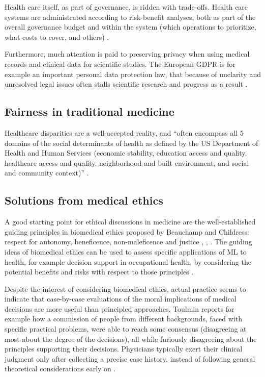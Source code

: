     Health care itself, as part of governance, is ridden with trade-offs.
    Health care systems are administrated according to risk-benefit analyses, both as part of the overall governance budget and within the system (which operations to prioritize, what costs to cover, and others) \cite{Dionne2018}.

    Furthermore, much attention is paid to preserving privacy when using medical records and clinical data for scientific studies.
    The European GDPR is for example an important personal data protection law, that because of unclarity and unresolved legal issues often stalls scientific research and progress as a result \cite{Eiss2020}.


\subsection{Fairness in traditional medicine}
    Healthcare disparities are a well-accepted reality, and ``often encompass all 5 domains of the social determinants of health as defined by the US Department of Health and Human Services (economic stability, education access and quality, healthcare access and quality, neighborhood and built environment, and social and community context)'' \cite[p.~2]{Chen2021}.


\subsection{Solutions from medical ethics}
    A good starting point for ethical discussions in medicine are the well-established guiding principles in biomedical ethics proposed by Beauchamp and Childress: respect for autonomy, beneficence, non-maleficence and justice \cite[pp.~344-345]{Dijkstra2020}, \cite[p.~2]{Morley2020}, \cite[p.~2]{Rajkomar2018}.
    The guiding ideas of biomedical ethics can be used to assess specific applications of ML to health, for example decision support in occupational health, by considering the potential benefits and risks with respect to those principles \cite{Dijkstra2020}.

    Despite the interest of considering biomedical ethics, actual practice seems to indicate that case-by-case evaluations of the moral implications of medical decisions are more useful than principled approaches.
    Toulmin\cite{Toulmin1982} reports for example how a commission of people from different backgrounds, faced with specific practical problems, were able to reach some consensus (disagreeing at most about the degree of the decisions), all while furiously disagreeing about the principles supporting their decisions.
    Physicians typically exert their clinical judgment only after collecting a precise case history, instead of following general theoretical considerations early on \cite{Toulmin1982}.
